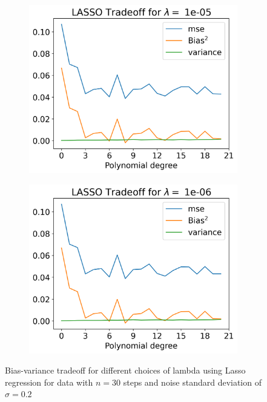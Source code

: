 \documentclass[12pt]{article}
\begin{document}
\begin{figure}[H]
\begin{subfigure}{.5\textwidth}
    \includegraphics[width=\textwidth]{../figures/tradeoff_LASSO_1e-0520.png}
    \caption{}
    \label{fig:l_1e-12}
  \end{subfigure}
  \begin{subfigure}{.5\textwidth}
    \centering
    \includegraphics[width=\textwidth]{../figures/tradeoff_LASSO_1e-0620.png}
    \caption{}
    \label{fig:l_1e-13}
  \end{subfigure}
  \caption{Bias-variance tradeoff for different choices of lambda using Lasso regression for data with $n=30$ steps and noise standard deviation of $\sigma=0.2$}
  \label{fig:lasso_tradeoff}
\end{figure}
\end{document}

